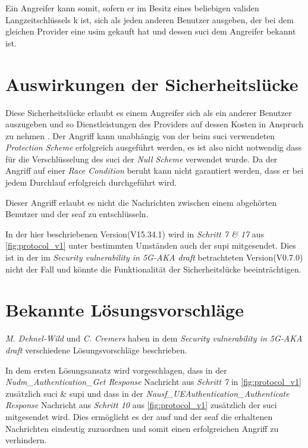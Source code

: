 Ein Angreifer kann somit, sofern er im Besitz eines beliebigen validen Langzeitschlüssels \gls{k} ist, sich als jeden anderen Benutzer ausgeben, der bei dem gleichen Provider eine \gls{usim} gekauft hat und dessen \gls{suci} dem Angreifer bekannt ist.


\section{Auswirkungen der Sicherheitslücke}

Diese Sicherheitslücke erlaubt es einem Angreifer sich als ein anderer Benutzer auszugeben und so Dienstleistungen des Providers auf dessen Kosten in Anspruch zu nehmen \cite{vulnerability}.
Der Angriff kann unabhängig von der beim \gls{suci} verwendeten \textit{Protection Scheme} erfolgreich ausgeführt werden, es ist also nicht notwendig dass für die Verschlüsselung des \gls{suci} der \textit{Null Scheme} verwendet wurde.
Da der Angriff auf einer \textit{Race Condition} beruht kann nicht garantiert werden, dass er bei jedem Durchlauf erfolgreich durchgeführt wird.

Dieser Angriff erlaubt es nicht die Nachrichten zwischen einem abgehörten Benutzer und der \gls{seaf} zu entschlüsseln.

In der hier beschriebenen Version(V15.34.1) wird in \textit{Schritt 7 \& 17} aus \cref{fig:protocol_v1} unter bestimmten Umständen auch der \gls{supi} mitgesendet.
Dies ist in der im \textit{Security vulnerability in 5G-AKA draft} betrachteten Version(V0.7.0) nicht der Fall und könnte die Funktionalität der Sicherheitslücke beeinträchtigen.


\section{Bekannte Lösungsvorschläge}

\textit{M. Dehnel-Wild} und \textit{C. Cremers} haben in dem \textit{Security vulnerability in 5G-AKA draft} \cite{vulnerability} verschiedene Lösungsvorschläge beschrieben.

In dem ersten Lösungsansatz wird vorgeschlagen, dass in der \textit{Nudm\_Authentication\_Get Response} Nachricht aus \textit{Schritt 7} in \cref{fig:protocol_v1} zusätzlich \gls{suci} \& \gls{supi} und dass in der \textit{Nausf\_UEAuthentication\_Authenticate Response} Nachricht aus \textit{Schritt 10} aus \cref{fig:protocol_v1} zusätzlich der \gls{suci} mitgesendet wird.
Dies ermöglicht es der \gls{ausf} und der \gls{seaf} die erhaltenen Nachrichten eindeutig zuzuordnen und somit einen erfolgreichen Angriff zu verhindern.

